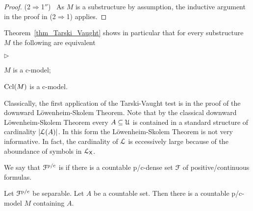 \documentclass{amsproc}
\newcommand{\mylabel}[1]{{#1}\hfill}
\renewenvironment{itemize}
  {\begin{list}{$\triangleright$}{%
  \setlength{\parskip}{0mm}
  \setlength{\topsep}{.4\baselineskip}
  \setlength{\rightmargin}{0mm}
  \setlength{\listparindent}{0mm}
  \setlength{\itemindent}{0mm}
  \setlength{\labelwidth}{3ex}
  \setlength{\itemsep}{.2\baselineskip}
  \setlength{\parsep}{.2\baselineskip}
  \setlength{\partopsep}{0mm}
  \setlength{\labelsep}{1ex}
  \setlength{\leftmargin}{\labelwidth+\labelsep}
  \let\makelabel\mylabel}}{%
\end{list}}
\renewcommand*{\emph}[1]{%
   \smash{\tikz[baseline]\node[rectangle, fill=teal!25, rounded corners, inner xsep=0.5ex, inner ysep=0.2ex, anchor=base, minimum height = 2.7ex]{\strut #1};}}
\begin{document}
{\begin{proof}
  (2$\Rightarrow$1$''$) \ 
  As $M$ is a substructure by assumption, the inductive argument in the proof in (2$\Rightarrow$1) applies.
\end{proof}


    
   


\begin{remark}\label{rem_Tarski_Vaught}
  Theorem~\ref{thm_Tarski_Vaught} shows in particular that for every substructure $M$ the following are equivalent
  \begin{itemize}
    \item[1.] $M$ is a c-model;
    \item[2.] ${\rm Ccl}(M)$ is a c-model.
  \end{itemize}
\end{remark}

Classically, the first application of the Tarski-Vaught test is in the proof of the downward L\"owen\-heim-Skolem Theorem.
Note that by the classical downward L\"owenheim-Skolem Theorem every $A\subseteq{\EuScript U}$ is contained in a standard structure of cardinality $|{\EuScript L}(A)|$.
In this form the L\"owenheim-Skolem Theorem is not very informative.
In fact, the cardinality of ${\EuScript L}$ is eccessively large because of the aboundance of symbols in ${\EuScript L}_{\sf X}$.

We say that ${\EuScript F}^{\rm p/c}$ is \emph{separable\/} if there is a countable p/c-dense set ${\EuScript F}$ of positive/continuous formulas.

\begin{proposition}
  Let ${\EuScript F}^{\rm p/c}$ be separable.
  Let $A$ be a countable set.
  Then there is a countable p/c-model $M$ containing $A$.
\end{proposition}

}
\end{document}

